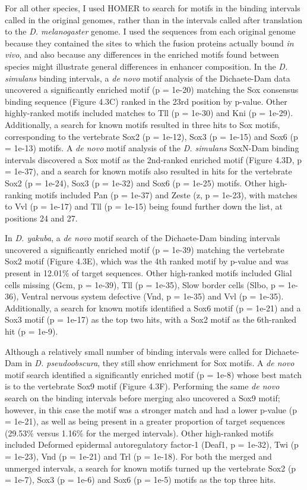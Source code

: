 For all other species, I used HOMER to search for motifs in the binding intervals called in the original genomes, rather than in the intervals called after translation to the \emph{D. melanogaster} genome. I used the sequences from each original genome because they contained the sites to which the fusion proteins actually bound \emph{in vivo}, and also because any differences in the enriched motifs found between species might illustrate general differences in enhancer composition. In the \emph{D. simulans} binding intervals, a \emph{de novo} motif analysis of the Dichaete-Dam data uncovered a significantly enriched motif (p = 1e-20) matching the Sox consensus binding sequence (Figure 4.3C) ranked in the 23rd position by p-value. Other highly-ranked motifs included matches to Tll (p = 1e-30) and Kni (p = 1e-29). Additionally, a search for known motifs resulted in three hits to Sox motifs, corresponding to the vertebrate Sox2 (p = 1e-12), Sox3 (p = 1e-15) and Sox6 (p = 1e-13) motifs. A \emph{de novo} motif analysis of the \emph{D. simulans} SoxN-Dam binding intervals discovered a Sox motif as the 2nd-ranked enriched motif (Figure 4.3D, p = 1e-37), and a search for known motifs also resulted in hits for the vertebrate Sox2 (p = 1e-24), Sox3 (p = 1e-32) and Sox6 (p = 1e-25) motifs. Other high-ranking motifs included Pan (p = 1e-37) and Zeste (z, p = 1e-23), with matches to Vvl (p = 1e-17) and Tll (p = 1e-15) being found further down the list, at positions 24 and 27.

In \emph{D. yakuba}, a \emph{de novo} motif search of the Dichaete-Dam binding intervals uncovered a significantly enriched motif (p = 1e-39) matching the vertebrate Sox2 motif (Figure 4.3E), which was the 4th ranked motif by p-value and was present in 12.01\% of target sequences. Other high-ranked motifs included Glial cells missing (Gcm, p = 1e-39), Tll (p = 1e-35), Slow border cells (Slbo, p = 1e-36), Ventral nervous system defective (Vnd, p = 1e-35) and Vvl (p = 1e-35). Additionally, a search for known motifs identified a Sox6 motif (p = 1e-21) and a Sox3 motif (p = 1e-17) as the top two hits, with a Sox2 motif as the 6th-ranked hit (p = 1e-9).

Although a relatively small number of binding intervals were called for Dichaete-Dam in \emph{D. pseudoobscura}, they still show enrichment for Sox motifs. A \emph{de novo} motif search identified a significantly enriched motif (p = 1e-8) whose best match is to the vertebrate Sox9 motif (Figure 4.3F). Performing the same \emph{de novo} search on the binding intervals before merging also uncovered a Sox9 motif; however, in this case the motif was a stronger match and had a lower p-value (p = 1e-21), as well as being present in a greater proportion of target sequences (29.53\% versus 1.16\% for the merged intervals). Other high-ranked motifs included Deformed epidermal autoregulatory factor-1 (Deaf1, p = 1e-32), Twi (p = 1e-23), Vnd (p = 1e-21) and Trl (p = 1e-18). For both the merged and unmerged intervals, a search for known motifs turned up the vertebrate Sox2 (p = 1e-7), Sox3 (p = 1e-6) and Sox6 (p = 1e-5) motifs as the top three hits.

